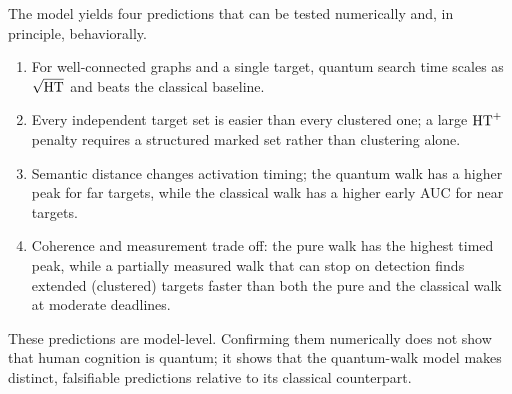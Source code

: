 The model yields four predictions that can be tested numerically and, in
principle, behaviorally.
\begin{enumerate}[leftmargin=1.4em]
  \item For well-connected graphs and a single target, quantum search time
  scales as $\sqrt{\mathrm{HT}}$ and beats the classical baseline.
  \item Every independent target set is easier than every clustered one; a
  large $\mathrm{HT}^+$ penalty requires a structured marked set rather than clustering
  alone.
  \item Semantic distance changes activation timing; the quantum walk has a
  higher peak for far targets, while the classical walk has a higher early AUC
  for near targets.
  \item Coherence and measurement trade off: the pure walk has the highest
  timed peak, while a partially measured walk that can stop on detection finds
  extended (clustered) targets faster than both the pure and the classical
  walk at moderate deadlines.
\end{enumerate}
These predictions are model-level. Confirming them numerically does not show
that human cognition is quantum; it shows that the quantum-walk model makes
distinct, falsifiable predictions relative to its classical counterpart.
